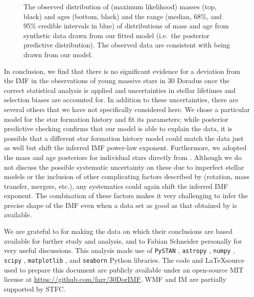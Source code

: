 \documentclass[apjl]{emulateapj}
\newcommand{\MSun}{M_\odot}
\begin{document}
\begin{figure}
    		\caption{The observed distribution of (maximum likelihood) masses (top, black) and ages (bottom, black) and the range (median, 68\%, and 95\% credible intervals in blue) of distributions of mass and age from synthetic data drawn from our fitted model (i.e.\ the posterior predictive distribution).  The observed data are consistent with being drawn from our model.  %
		}\label{fig:PPC}
\end{figure}


In conclusion, we find that there is no significant evidence for a deviation from the \citet{Salpeter:1955} IMF  in the observations of young massive stars in 30 Doradus once the correct statistical analysis is applied and uncertainties in stellar lifetimes and selection biases are accounted for.  In addition to these uncertainties, there are several others that we have not specifically considered here.   We chose a particular model for the star formation history and fit its parameters; while posterior predictive checking confirms that our model is able to explain the data, it is possible that a different star formation history model could match the data just as well but shift the inferred IMF power-law exponent.  Furthermore, we adopted the mass and age posteriors for individual stars directly from \citet{Schneider:2018}.  Although we do not discuss the possible systematic uncertainty on these due to imperfect stellar models or the inclusion of other complicating factors described by \citet{Schneider:2018} (rotation, mass transfer, mergers, etc.), any systematics could again shift the inferred IMF exponent.  
The combination of these factors makes it very challenging to infer the precise shape of the IMF even when a data set as good as that obtained by is \citet{Schneider:2018} available.

\acknowledgments

We are grateful to \citet{Schneider:2018} for making the data on which their conclusions are
based available for further study and analysis, and to Fabian Schneider personally for very useful discussions.  This analysis made use of \texttt{PySTAN} \citep{PySTAN}, \texttt{astropy} \citep{astropy}, \texttt{numpy} \citep{numpy}, \texttt{scipy} \citep{scipy}, \texttt{matplotlib} \citep{matplotlib}, and \texttt{seaborn} \citep{seaborn} Python libraries.  The code and \LaTeX source used to prepare this document are publicly available under an open-source MIT license at \url{https://github.com/farr/30DorIMF}.  WMF and IM are partially supported by STFC.



\end{document}
